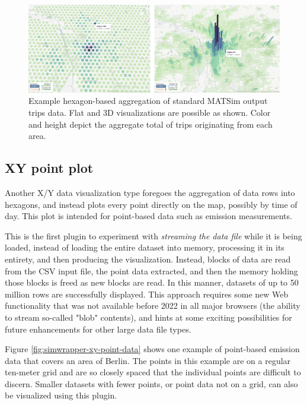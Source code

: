 \begin{figure}[ht]
  \centering
  \includegraphics[width=0.95\linewidth]{chapters/31-simwrapper/images/xy-hexagons.jpg}
  \caption{Example hexagon-based aggregation of standard MATSim output trips data. Flat and 3D visualizations are possible as shown. Color and height depict the aggregate total of trips originating from each area. }
  \label{fig:simwrapper-xy-hexagons}
\end{figure}

\hypertarget{simwrapper-xyt-plots}{%
\subsection{XY point plot}\label{simwrapper-xy-point-plots}}

Another X/Y data visualization type foregoes the aggregation of data rows into hexagons, and instead plots every point directly on the map, possibly by time of day. This plot is intended for point-based data such as emission measurements.

This is the first plugin to experiment with \emph{streaming the data file} while it is being loaded, instead of loading the entire dataset into memory, processing it in its entirety, and then producing the visualization. Instead, blocks of data are read from the CSV input file, the point data extracted, and then the memory holding those blocks is freed as new blocks are read. In this manner, datasets of up to 50 million rows are successfully displayed. This approach requires some new Web functionality that was not available before 2022 in all major browsers (the ability to stream so-called "blob" contents), and hints at some exciting possibilities for future enhancements for other large data file types.

Figure \ref{fig:simwrapper-xy-point-data} shows one example of point-based emission data that covers an area of Berlin. The points in this example are on a regular ten-meter grid and are so closely spaced that the individual points are difficult to discern. Smaller datasets with fewer points, or point data not on a grid, can also be visualized using this plugin.

